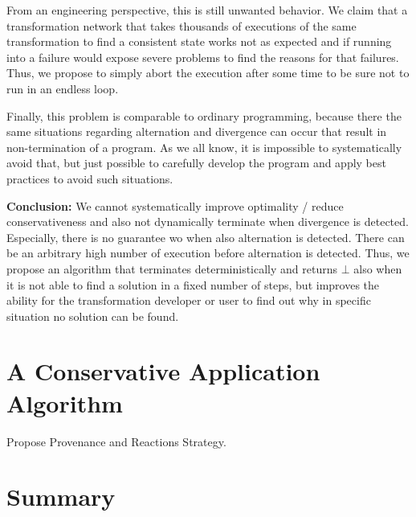 From an engineering perspective, this is still unwanted behavior. We claim that a transformation network that takes thousands of executions of the same transformation to find a consistent state works not as expected and if running into a failure would expose severe problems to find the reasons for that failures.
Thus, we propose to simply abort the execution after some time to be sure not to run in an endless loop.

Finally, this problem is comparable to ordinary programming, because there the same situations regarding alternation and divergence can occur that result in non-termination of a program.
As we all know, it is impossible to systematically avoid that, but just possible to carefully develop the program and apply best practices to avoid such situations.


\textbf{Conclusion:} We cannot systematically improve optimality / reduce conservativeness and also not dynamically terminate when divergence is detected. Especially, there is no guarantee wo when also alternation is detected. There can be an arbitrary high number of execution before alternation is detected.
Thus, we propose an algorithm that terminates deterministically and returns $\bot$ also when it is not able to find a solution in a fixed number of steps, but improves the ability for the transformation developer or user to find out why in specific situation no solution can be found.




\section{A Conservative Application Algorithm}

Propose Provenance and Reactions Strategy.




\section{Summary}



